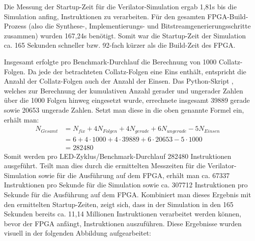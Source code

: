     Die Messung der Startup-Zeit für die Verilator-Simulation ergab 1,81s bis die Simulation anfing, Instruktionen zu verarbeiten.
    Für den gesamten FPGA-Build-Prozess (also die Synthese-, Implementierungs- und Bitstreamgenerierungsschritte zusammen) wurden 167,24s benötigt.
    Somit war die Startup-Zeit der Simulation ca. 165 Sekunden schneller bzw. 92-fach kürzer als die Build-Zeit des FPGA.

    Insgesamt erfolgte pro Benchmark-Durchlauf die Berechnung von 1000 Collatz-Folgen.
    Da jede der betrachteten Collatz-Folgen eine Eins enthält, entspricht die Anzahl der Collatz-Folgen auch der Anzahl der Einsen.
    Das Python-Skript \parencite{GitHub-Bachelorarbeit}, welches zur Berechnung der kumulativen Anzahl gerader und ungerader Zahlen über die 1000 Folgen hinweg eingesetzt wurde, errechnete insgesamt 39889 gerade sowie 20653 ungerade Zahlen.
    Setzt man diese in die oben genannte Formel ein, erhält man:
    \[
    \begin{aligned}
    N_{Gesamt} &= N_{fix} + 4N_{Folgen} + 4N_{gerade} + 6N_{ungerade} - 5N_{Einsen} \\
               &= 6 + 4 \cdot 1000 + 4 \cdot 39889 + 6 \cdot 20653 - 5 \cdot 1000 \\
               &= 282480
    \end{aligned}
    \]
    Somit werden pro LED-Zyklus/Benchmark-Durchlauf 282480 Instruktionen ausgeführt.
    Teilt man dies durch die ermittelten Messzeiten für die Verilator-Simulation sowie für die Ausführung auf dem FPGA, erhält man ca. 67337 Instruktionen pro Sekunde für die Simulation sowie ca. 307712 Instruktionen pro Sekunde für die Ausführung auf dem FPGA.
    Kombiniert man dieses Ergebnis mit den ermittelten Startup-Zeiten, zeigt sich, dass in der Simulation in den 165 Sekunden bereits ca. 11,14 Millionen Instruktionen verarbeitet werden können, bevor der FPGA anfängt, Instruktionen auszuführen.
    Diese Ergebnisse wurden visuell in der folgenden Abbildung aufgearbeitet:



